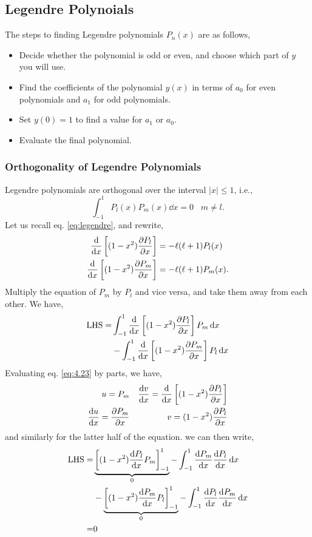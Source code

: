 \documentclass{book}
\begin{document}
\subsection{Legendre Polynoials}
The steps to finding Legendre polynomials $P_n(x)$ are as follows,
\begin{itemize}
	\item Decide whether the polynomial is odd or even, and choose which part of $y$ you will use.
	\item Find the coefficients of the polynomial $y(x)$ in terms of $a_0$ for even polynomials and $a_1$ for odd polynomials.
	\item Set $y(0) = 1$ to find a value for $a_1$ or $a_0$.
	\item Evaluate the final polynomial.
\end{itemize}
\subsubsection{Orthogonality of Legendre Polynomials}
Legendre polynomials are orthogonal over the interval $|x| \leq 1$, i.e.,
\begin{equation}
	\int_{-1}^{1} P_l(x) P_{m}(x) \dd{x} = 0 \hspace{10pt} m \neq l.
\end{equation}
Let us recall eq. \eqref{eq:legendre}, and rewrite,
\begin{align}
	\dv{x}\left[(1-x^2)\pdv{P_l}{x}\right]& = - \ell(\ell+1)P_l(x) \\
	\dv{x}\left[(1-x^2)\pdv{P_m}{x}\right]& = - \ell(\ell+1)P_m(x).
\end{align}
Multiply the equation of $P_m$ by $P_l$ and vice versa, and take them away from each other. We have,
\begin{equation}
	\begin{split}
		\text{LHS} = & \int_{-1}^{1}\dv{x}\left[(1-x^2)\pdv{P_l}{x}\right]P_m\dd{x} \\
		& -\int_{-1}^{1}\dv{x}\left[(1-x^2)\pdv{P_m}{x}\right]P_l\dd{x}
	\end{split}\label{eq:4.23}
\end{equation}
Evaluating eq. \eqref{eq:4.23} by parts, we have,
	\begin{align}
		u = P_m && \dv{v}{x} = \dv{x}\left[(1-x^2)\pdv{P_l}{x}\right] \\
		\dv{u}{x} = \pdv{P_m}{x} && v = (1-x^2)\pdv{P_l}{x}
	\end{align}
and similarly for the latter half of the equation. we can then write,
\begin{equation}
	\begin{split}
		\text{LHS} = & \underbrace{\left[(1-x^2)\dv{P_l}{x}P_m\right]_{-1}^{1}}_0 - \int_{-1}^{1}\dv{P_m}{x}(1-x^2)\dv{P_l}{x}\dd{x} \\
		& - \underbrace{\left[(1-x^2)\dv{P_m}{x}P_l\right]_{-1}^{1}}_0 - \int_{-1}^{1}\dv{P_l}{x}(1-x^2)\dv{P_m}{x}\dd{x} \\
		= & 0
	\end{split}
\end{equation}
\appendix
\end{document}
